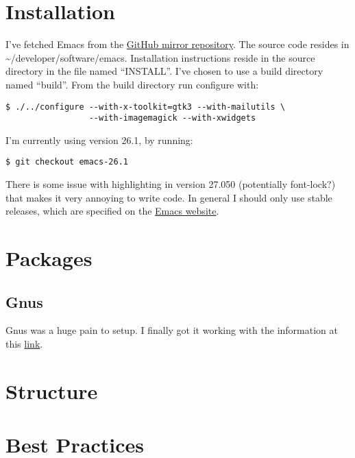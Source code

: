 \documentclass{default}
\begin{document}
\tableofcontents
\hypersetup{linkcolor=red}

\chapter{Installation}\label{cha:installation}

I've fetched Emacs from the \href{https://github.com/emacs-mirror/emacs}{GitHub mirror
  repository}. The source code resides in \textasciitilde/developer/software/emacs. Installation
instructions reside in the source directory in the file named ``INSTALL''. I've chosen to use a
build directory named ``build''. From the build directory run configure with:

\begin{verbatim}
$ ./../configure --with-x-toolkit=gtk3 --with-mailutils \
                 --with-imagemagick --with-xwidgets
\end{verbatim}

I'm currently using version 26.1, by running:

\begin{verbatim}
$ git checkout emacs-26.1
\end{verbatim}

There is some issue with highlighting in version 27.050 (potentially font-lock?) that makes it very
annoying to write code. In general I should only use stable releases, which are specified on the
\href{https://www.gnu.org/software/emacs/}{Emacs website}.

\chapter{Packages}\label{cha:packages}

\section{Gnus}
\label{sec:gnus}

Gnus was a huge pain to setup. I finally got it working with the information at this
\href{https://eschulte.github.io/emacs-starter-kit/starter-kit-gnus-imap.html}{link}.

\chapter{Structure}\label{cha:structure}


\chapter{Best Practices}
\label{cha:best-practices}
\end{document}
